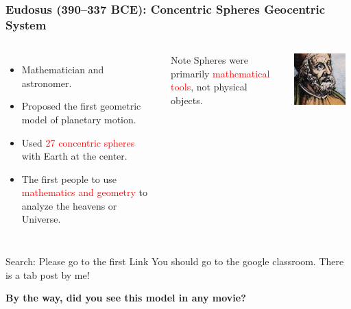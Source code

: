 \documentclass[aspectratio=1611, 9pt]{beamer}
\begin{document}
\begin{frame}
  \frametitle{Eudosus (390–337 BCE): Concentric Spheres Geocentric System}
  \begin{columns}
    \begin{itemize}
      \item Mathematician and astronomer.
      \item Proposed the first geometric model of planetary motion.
      \item Used \textcolor{red}{27 concentric spheres} with Earth at the center.
      \item The first people to use \textcolor{red}{mathematics and geometry} to analyze the heavens or Universe.
    \end{itemize}
    \begin{alertblock}{Note}
      Spheres were primarily \textcolor{red}{mathematical tools}, not physical objects.
    \end{alertblock}

    \begin{center}
      \includegraphics[width=0.9\textwidth]{pictures/eudosus.jpg}
    \end{center}
  \end{columns}  
\end{frame}

\begin{frame}
  \begin{block}{Search: Please go to the first Link}
    You should go to the google classroom. There is a tab post by me!
  \end{block}

  \begin{center}
  \textbf{By the way, did you see this model in any movie?}
  \end{center}
\end{frame}
\end{document}

